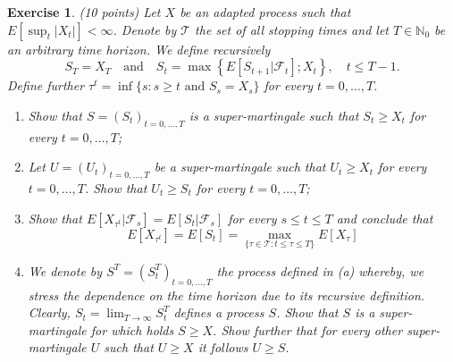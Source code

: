 \documentclass[DIV=classic,a4paper,10pt]{scrartcl}
\newtheorem{exercise}[theorem]{Exercise}
\theoremstyle{nonumberplain}
\numberwithin{equation}{section}
\begin{document}
\begin{exercise}(10 points)
    Let $X$ be an adapted process such that $E[\sup_t |X_t|]<\infty$.
    Denote by $\mathcal{T}$ the set of all stopping times and let $T \in \mathbb{N}_0$ be an arbitrary time horizon.
    We define recursively
    \begin{equation*}
        S_T=X_T\quad \text{and}\quad S_t=\max \left\{ E\left[ S_{t+1}|\mathcal{F}_t \right];X_t \right\}, \quad t\leq T-1.
    \end{equation*}
    Define further $\tau^t=\inf\{s\colon s\geq t \text{ and }S_s=X_s\}$ for every $t=0,\ldots, T$.
    \begin{enumerate}[label=(\alph*)]
        \item Show that $S=(S_t)_{t=0,\ldots, T}$ is a super-martingale such that $S_t\geq X_t$ for every $t=0,\ldots, T$;
        \item Let $U=(U_t)_{t=0,\ldots,T}$ be a super-martingale such that $U_t\geq X_t$ for every $t=0,\ldots,T$.
            Show that $U_t\geq S_t$ for every $t=0,\ldots, T$;
        \item Show that $E[X_{\tau^t}|\mathcal{F}_s]=E[S_t|\mathcal{F}_s]$ for every $s\leq t\leq T$ and conclude that
            \begin{equation*}
                E\left[ X_{\tau^t} \right]=E\left[ S_t \right]=\max_{\{\tau \in \mathcal{T}\colon t\leq \tau\leq T\}} E\left[ X_\tau \right]
            \end{equation*}
        \item We denote by $S^T=(S_t^T)_{t=0,\ldots, T}$ the process defined in (a) whereby, we stress the dependence on the time horizon due to its recursive definition.
            Clearly, $S_t=\lim_{T\to \infty} S^T_t$ defines a process $S$.
            Show that $S$ is a super-martingale for which holds $S\geq X$.
            Show further that for every other super-martingale $U$ such that $U\geq X$ it follows $U\geq S$.
    \end{enumerate}
\end{exercise}
\end{document}

